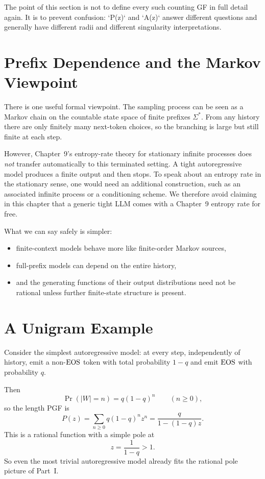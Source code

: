 The point of this section is not to define every such counting GF in full detail again. It is to prevent confusion: `P(z)` and `A(z)` answer different questions and generally have different radii and different singularity interpretations.

\section{Prefix Dependence and the Markov Viewpoint}

There is one useful formal viewpoint. The sampling process can be seen as a Markov chain on the countable state space of finite prefixes $\Sigma^*$. From any history there are only finitely many next-token choices, so the branching is large but still finite at each step.

However, Chapter~9's entropy-rate theory for stationary infinite processes does \emph{not} transfer automatically to this terminated setting. A tight autoregressive model produces a finite output and then stops. To speak about an entropy rate in the stationary sense, one would need an additional construction, such as an associated infinite process or a conditioning scheme. We therefore avoid claiming in this chapter that a generic tight LLM comes with a Chapter~9 entropy rate for free.

What we can say safely is simpler:
\begin{itemize}
  \item finite-context models behave more like finite-order Markov sources,
  \item full-prefix models can depend on the entire history,
  \item and the generating functions of their output distributions need not be rational unless further finite-state structure is present.
\end{itemize}

\section{A Unigram Example}

Consider the simplest autoregressive model: at every step, independently of history, emit a non-$\operatorname{EOS}$ token with total probability $1-q$ and emit $\operatorname{EOS}$ with probability $q$.

Then
\[
  \Pr(|W|=n) = q(1-q)^n
  \qquad (n \ge 0),
\]
so the length PGF is
\[
  P(z) = \sum_{n \ge 0} q(1-q)^n z^n = \frac{q}{1-(1-q)z}.
\]
This is a rational function with a simple pole at
\[
  z = \frac{1}{1-q} > 1.
\]
So even the most trivial autoregressive model already fits the rational pole picture of Part~I.


